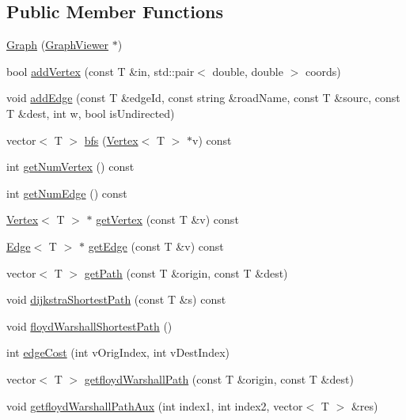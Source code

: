 \subsection*{Public Member Functions}
\begin{DoxyCompactItemize}
\item 
\hyperlink{classGraph_acda25b82a1565955306b44ae01660349}{Graph} (\hyperlink{classGraphViewer}{Graph\+Viewer} $\ast$)
\item 
bool \hyperlink{classGraph_a18f099535183b37aef90bb55f4669e65}{add\+Vertex} (const T \&in, std\+::pair$<$ double, double $>$ coords)
\item 
void \hyperlink{classGraph_af720eb3f731732a2fafc40141f4d41c3}{add\+Edge} (const T \&edge\+Id, const string \&road\+Name, const T \&sourc, const T \&dest, int w, bool is\+Undirected)
\item 
vector$<$ T $>$ \hyperlink{classGraph_a0e9598b98be2570eb432690411a577e8}{bfs} (\hyperlink{classVertex}{Vertex}$<$ T $>$ $\ast$v) const 
\item 
int \hyperlink{classGraph_a295932f117d92c825a97ec458e0fb332}{get\+Num\+Vertex} () const 
\item 
int \hyperlink{classGraph_ad10eead5afadfb05a78fd8dd606238f8}{get\+Num\+Edge} () const 
\item 
\hyperlink{classVertex}{Vertex}$<$ T $>$ $\ast$ \hyperlink{classGraph_a08a95472b0d9bd7321660940807af060}{get\+Vertex} (const T \&v) const 
\item 
\hyperlink{classEdge}{Edge}$<$ T $>$ $\ast$ \hyperlink{classGraph_af6579aaa220d1b403cb3517266e406cf}{get\+Edge} (const T \&v) const 
\item 
vector$<$ T $>$ \hyperlink{classGraph_ab4054ca572c10669dd3e05d6d41c116c}{get\+Path} (const T \&origin, const T \&dest)
\item 
void \hyperlink{classGraph_a3631bce147c033119e2d328848effd43}{dijkstra\+Shortest\+Path} (const T \&s) const 
\item 
void \hyperlink{classGraph_ae5161f4408bf1ead2b29d19d67fb04ee}{floyd\+Warshall\+Shortest\+Path} ()
\item 
int \hyperlink{classGraph_a7e137f1ef838395ac1044a944fa54448}{edge\+Cost} (int v\+Orig\+Index, int v\+Dest\+Index)
\item 
vector$<$ T $>$ \hyperlink{classGraph_ab23d1dae92a7f2b29dcb91a94336674c}{getfloyd\+Warshall\+Path} (const T \&origin, const T \&dest)
\item 
void \hyperlink{classGraph_aad1eda4beb8425d03ed1f3b8af397563}{getfloyd\+Warshall\+Path\+Aux} (int index1, int index2, vector$<$ T $>$ \&res)

\end{DoxyCompactItemize}
